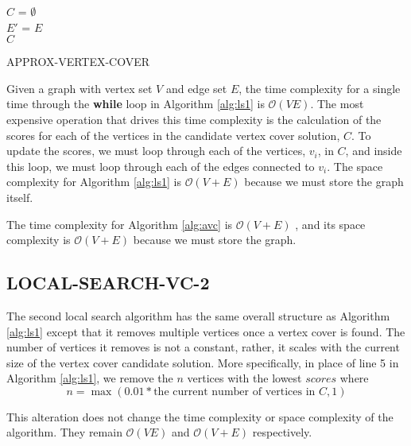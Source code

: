 \documentclass[sigconf]{acmart}
\newcommand{\bigo}[1]{\mathcal{O}(#1)}
\begin{document}
\begin{algorithm}[h]
	\SetAlgoNoLine
	$C$ = $\emptyset$\\
	$E'$ = $E$\\
	\Return $C$
	
	\caption{APPROX-VERTEX-COVER}
	\label{alg:avc}
\end{algorithm}

Given a graph with vertex set $V$ and edge set $E$, the time complexity for a single time through the \textbf{while} loop in Algorithm \ref{alg:ls1} is $\bigo{VE}$. The most expensive operation that drives this time complexity is the calculation of the scores for each of the vertices in the candidate vertex cover solution, $C$. To update the scores, we must loop through each of the vertices, $v_i$, in $C$, and inside this loop, we must loop through each of the edges connected to $v_i$. The space complexity for Algorithm \ref{alg:ls1} is $\bigo{V + E}$ because we must store the graph itself.

The time complexity for Algorithm \ref{alg:avc} is $\bigo{V + E}$ \cite{intro_alg_2009}, and its space complexity is $\bigo{V + E}$ because we must store the graph.  

\subsection{LOCAL-SEARCH-VC-2}
The second local search algorithm has the same overall structure as Algorithm \ref{alg:ls1} except that it removes multiple vertices once a vertex cover is found. The number of vertices it removes is not a constant, rather, it scales with the current size of the vertex cover candidate solution. More specifically, in place of line 5 in Algorithm \ref{alg:ls1}, we remove the $n$ vertices with the lowest $scores$ where
\begin{equation}
	n = \max(0.01 * \textrm{the current number of vertices in $C$}, 1)
\end{equation}

This alteration does not change the time complexity or space complexity of the algorithm. They remain $\bigo{VE}$ and $\bigo{V + E}$ respectively.
\end{document}
